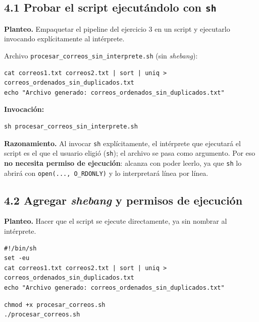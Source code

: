 \documentclass[11pt,a4paper]{article}
\begin{document}
\subsection*{4.1 Probar el script ejecutándolo con \texttt{sh}}

\textbf{Planteo.} Empaquetar el pipeline del ejercicio 3 en un script
y ejecutarlo invocando explícitamente al intérprete.

Archivo \texttt{procesar\_correos\_sin\_interprete.sh} (sin
\emph{shebang}):

\begin{lstlisting}[style=shellstyle]
cat correos1.txt correos2.txt | sort | uniq > correos_ordenados_sin_duplicados.txt
echo "Archivo generado: correos_ordenados_sin_duplicados.txt"
\end{lstlisting}

\textbf{Invocación:}

\begin{lstlisting}
sh procesar_correos_sin_interprete.sh
\end{lstlisting}

\textbf{Razonamiento.} Al invocar \texttt{sh} explícitamente, el
intérprete que ejecutará el script es el que el usuario eligió
(\texttt{sh}); el archivo se pasa como argumento. Por eso \textbf{no
necesita permiso de ejecución}: alcanza con poder leerlo, ya que
\texttt{sh} lo abrirá con \texttt{open(..., O\_RDONLY)} y lo
interpretará línea por línea.

\subsection*{4.2 Agregar \emph{shebang} y permisos de ejecución}

\textbf{Planteo.} Hacer que el script se ejecute directamente,
ya sin nombrar al intérprete.

\begin{lstlisting}[style=shellstyle]
#!/bin/sh
set -eu
cat correos1.txt correos2.txt | sort | uniq > correos_ordenados_sin_duplicados.txt
echo "Archivo generado: correos_ordenados_sin_duplicados.txt"
\end{lstlisting}

\begin{lstlisting}
chmod +x procesar_correos.sh
./procesar_correos.sh
\end{lstlisting}
\end{document}
